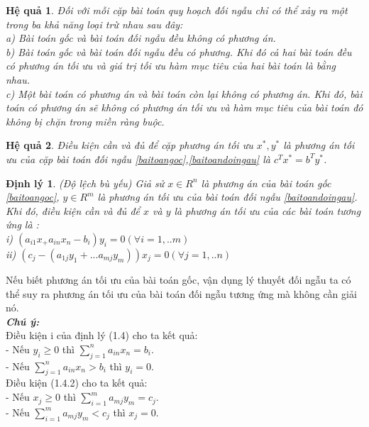 \documentclass[12pt,a4paper]{report}
\newtheorem{dl}{Định lý}[chapter]
\newtheorem{hq}{Hệ quả}[chapter]
\begin{document}
\begin{itemize}
\begin{hq}
        Đối với mỗi cặp bài toán quy hoạch đối ngẫu chỉ có thể xảy ra một trong ba khả năng loại trừ nhau sau đây:\\
        a) Bài toán gốc và bài toán đối ngẫu đều không có phương án.\\
        b) Bài toán gốc và bài toán đối ngẫu đều có phương. Khi đó cả hai bài toán đều có phương án tối ưu và giá trị tối ưu hàm mục tiêu của hai bài toán là bằng nhau.\\
        c) Một bài toán có phương án và bài toán còn lại không có phương án. Khi đó, bài toán có phương án sẽ không có phương án tối ưu và hàm mục tiêu của bài toán đó không bị chặn trong miền ràng buộc.
    \end{hq}
    \begin{hq}
        Điều kiện cần và đủ để cặp phương án tối ưu $x^*,y^*$ là phương án tối ưu của cặp bài toán đối ngẫu \eqref{baitoangoc},\eqref{baitoandoingau} là $c^Tx^*=b^Ty^*$.
    \end{hq}
    \begin{dl}
        (Độ lệch bù yếu) Giả sử $x \in R^n$ là phương án của bài toán gốc \eqref{baitoangoc}, $y\in R^m$ là phương án tối ưu của bài toán đối ngẫu \eqref{baitoandoingau}. Khi đó, điều kiện cần và đủ để $x$ và $y$ là phương án tối ưu của các bài toán tương ứng là :\\
        i) $(a_{i1}x_ +a_{in}x_n -b_i)y_i=0 (\forall {i=1,..m}) $ \\
        ii) $(c_j-(a_{1j} y_1+...a_{mj}y_m))x_j=0 (\forall{j=1,..n}) $ \\   
    \end{dl}
    Nếu biết phương án tối ưu của bài toán gốc, vận dụng lý thuyết đối ngẫu ta có thể suy ra phương án tối ưu của bài toán đối ngẫu tương ứng mà không cần giải nó.\\
    \textbf{\textit{Chú ý:}} \\
    Điều kiện i của định lý (1.4) cho ta kết quả:\\
        - Nếu $y_i \ge 0 $ thì $\sum_{j=1}^n a_{in}x_n=b_i.$\\
        - Nếu $\sum_{j=1}^n a_{in}x_n >b_i$ thì $y_i=0$.\\ 
    Điều kiện (1.4.2) cho ta kết quả:\\
        - Nếu $x_j \ge 0$ thì $\sum_{i=1}^m a_{mj}y_m=c_j.$\\
        - Nếu $\sum_{i=1}^m a_{mj}y_m<c_j$ thì $x_j=0$.\\
    \end{itemize}
\end{document}
